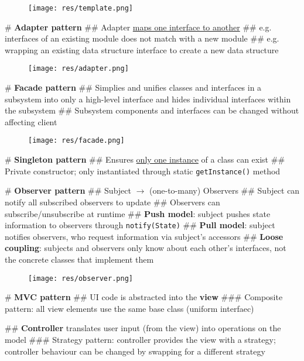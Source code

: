 \documentclass[11pt, oneside]{article}
\begin{document}
\begin{figure}[!ht]
    \centering
    \texttt{[image: res/template.png]}
\end{figure}

\newpage

# \textbf{Adapter pattern}
## Adapter \underline{maps one interface to another}
## e.g. interfaces of an existing module does not match with a new module
## e.g. wrapping an existing data structure interface to create a new data structure

\begin{figure}[!ht]
    \centering
    \texttt{[image: res/adapter.png]}
\end{figure}

# \textbf{Facade pattern}
## Simplies and unifies classes and interfaces in a subsystem into only a high-level interface and hides individual interfaces within the subsystem
## Subsystem components and interfaces can be changed without affecting client

\begin{figure}[!ht]
    \centering
    \texttt{[image: res/facade.png]}
\end{figure}

# \textbf{Singleton pattern}
## Ensures \underline{only one instance} of a class can exist
## Private constructor; only instantiated through static \texttt{getInstance()} method

\newpage
# \textbf{Observer pattern}
## Subject $\rightarrow$ (one-to-many) Observers
## Subject can notify all subscribed observers to update
## Observers can subscribe/unsubscribe at runtime
## \textbf{Push model}: subject pushes state information to observers through \texttt{notify(State)}
## \textbf{Pull model}: subject notifies observers, who request information via subject's accessors
## \textbf{Loose coupling}: subjects and observers only know about each other's interfaces, not the concrete classes that implement them

\begin{figure}[!ht]
    \centering
    \texttt{[image: res/observer.png]}
\end{figure}

# \textbf{MVC pattern}
## UI code is abstracted into the \textbf{view}
### Composite pattern: all view elements use the same base class (uniform interfaec)

## \textbf{Controller} translates user input (from the view) into operations on the model
### Strategy pattern: controller provides the view with a strategy; controller behaviour can be changed by swapping for a different strategy
\end{document}
